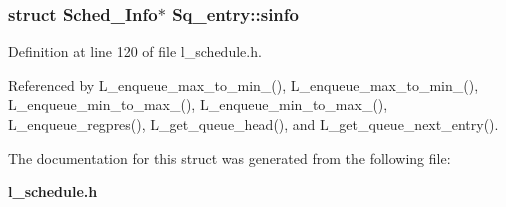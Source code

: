 \subsubsection{\setlength{\rightskip}{0pt plus 5cm}struct \bf{Sched\_\-Info}$\ast$ \bf{Sq\_\-entry::sinfo}}\label{structSq__entry_6839d29afae500d88efd490fb557c6cd}




Definition at line 120 of file l\_\-schedule.h.

Referenced by L\_\-enqueue\_\-max\_\-to\_\-min\_(), L\_\-enqueue\_\-max\_\-to\_\-min\_(), L\_\-enqueue\_\-min\_\-to\_\-max\_(), L\_\-enqueue\_\-min\_\-to\_\-max\_(), L\_\-enqueue\_\-regpres(), L\_\-get\_\-queue\_\-head(), and L\_\-get\_\-queue\_\-next\_\-entry().

The documentation for this struct was generated from the following file:\begin{CompactItemize}
\item 
\bf{l\_\-schedule.h}\end{CompactItemize}
